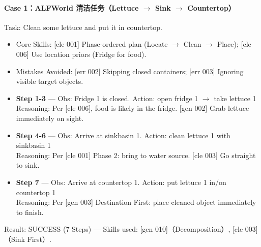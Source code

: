\documentclass[11pt,UTF8,fontset=fandol]{ctexart}
\begin{document}
\paragraph{Case 1：ALFWorld 清洁任务（Lettuce $\rightarrow$ Sink $\rightarrow$ Countertop）}
Task: Clean some lettuce and put it in countertop.
\begin{itemize}[leftmargin=1.5em,itemsep=0.1em]
\item Core Skills: [cle 001] Phase-ordered plan (Locate $\rightarrow$ Clean $\rightarrow$ Place); [cle 006] Use location priors (Fridge for food).
\item Mistakes Avoided: [err 002] Skipping closed containers; [err 003] Ignoring visible target objects.
\end{itemize}
\begin{itemize}[leftmargin=1.5em,itemsep=0.2em]
\item \textbf{Step 1-3} — Obs: Fridge 1 is closed. Action: open fridge 1 $\rightarrow$ take lettuce 1\\
  Reasoning: Per [cle 006], food is likely in the fridge. [gen 002] Grab lettuce immediately on sight.
\item \textbf{Step 4-6} — Obs: Arrive at sinkbasin 1. Action: clean lettuce 1 with sinkbasin 1\\
  Reasoning: Per [cle 001] Phase 2: bring to water source. [cle 003] Go straight to sink.
\item \textbf{Step 7} — Obs: Arrive at countertop 1. Action: put lettuce 1 in/on countertop 1\\
  Reasoning: Per [gen 003] Destination First: place cleaned object immediately to finish.
\end{itemize}
Result: SUCCESS (7 Steps) — Skills used: [gen 010]（Decomposition）, [cle 003]（Sink First）.
\end{document}
